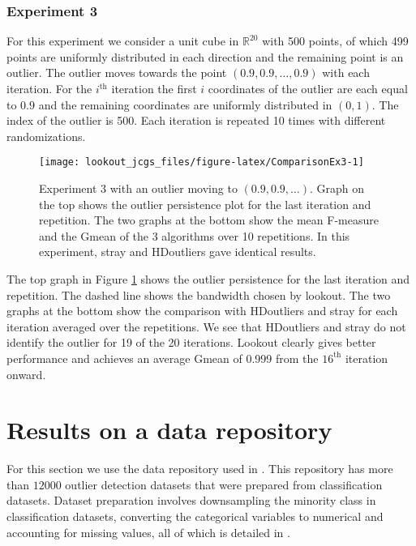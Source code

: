\documentclass[12pt]{article}
\theoremstyle{definition}
\theoremstyle{definition}
\theoremstyle{definition}
\theoremstyle{remark}
\begin{document}
\hypertarget{experiment-3}{%
\subsubsection*{Experiment 3}\label{experiment-3}}

For this experiment we consider a unit cube in \(\mathbb{R}^{20}\) with 500 points, of which 499 points are uniformly distributed in each direction and the remaining point is an outlier. The outlier moves towards the point \(\left( 0.9, 0.9, \dots, 0.9 \right)\) with each iteration. For the \(i^{\text{th}}\) iteration the first \(i\) coordinates of the outlier are each equal to \(0.9\) and the remaining coordinates are uniformly distributed in \((0,1)\). The index of the outlier is 500. Each iteration is repeated 10 times with different randomizations.

\begin{figure}
\texttt{[image: lookout\_jcgs\_files/figure-latex/ComparisonEx3-1]} \caption{Experiment 3 with an outlier moving to $(0.9, 0.9, \dots)$. Graph on the top shows the outlier persistence plot for the last iteration and repetition. The two graphs at the bottom show the mean F-measure and the Gmean of the 3 algorithms over 10 repetitions. In this experiment, stray and HDoutliers gave identical results.}\label{fig:ComparisonEx3}
\end{figure}

The top graph in Figure \ref{fig:ComparisonEx3} shows the outlier persistence for the last iteration and repetition. The dashed line shows the bandwidth chosen by lookout. The two graphs at the bottom show the comparison with HDoutliers and stray for each iteration averaged over the repetitions. We see that HDoutliers and stray do not identify the outlier for 19 of the 20 iterations. Lookout clearly gives better performance and achieves an average Gmean of 0.999 from the \(16^{\text{th}}\) iteration onward.

\hypertarget{sec:applications}{%
\section{Results on a data repository}\label{sec:applications}}

For this section we use the data repository used in \citet{datasets}. This repository has more than \(12000\) outlier detection datasets that were prepared from classification datasets. Dataset preparation involves downsampling the minority class in classification datasets, converting the categorical variables to numerical and accounting for missing values, all of which is detailed in \citet{normalizationoutliers}.
\end{document}
